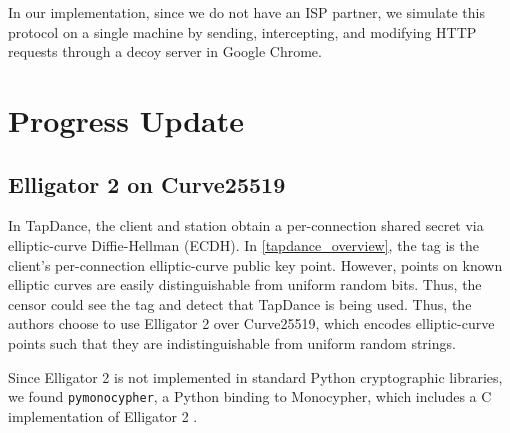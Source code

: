 \documentclass[conference]{IEEEtran}
\begin{document}

In our implementation, since we do not have an ISP partner, we simulate this protocol on a single machine by sending, intercepting, and modifying HTTP requests through a decoy server in Google Chrome.

\section{Progress Update}

\subsection{Elligator 2 on Curve25519}

In TapDance, the client and station obtain a per-connection shared secret via elliptic-curve Diffie-Hellman (ECDH). In \ref{tapdance_overview}, the tag is the client's per-connection elliptic-curve public key point. However, points on known elliptic curves are easily distinguishable from uniform random bits. Thus, the censor could see the tag and detect that TapDance is being used. Thus, the authors choose to use Elligator 2 over Curve25519, which encodes elliptic-curve points such that they are indistinguishable from uniform random strings.

Since Elligator 2 is not implemented in standard Python cryptographic libraries, we found \texttt{pymonocypher}, a Python binding to Monocypher, which includes a C implementation of Elligator 2 \cite{pymonocypher}.

\end{document}
